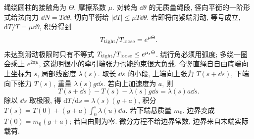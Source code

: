 绳绕圆柱的接触角为 $\Theta$, 摩擦系数 $\mu$. 对转角 $\dd\theta$ 的无质量绳段, 径向平衡的一阶形式给法向力 $\dd N=T\dd\theta$, 切向平衡给 $|\dd T|\le\mu T\dd\theta$. 若即将向紧端滑动, 等号成立, $\mathrm dT/T=\mu\dd\theta$, 积分得到
\begin{equation}
T_{\rm tight}/T_{\rm loose}=e^{\mu\Theta}.
\end{equation}
未达到滑动极限时只有不等式 $T_{\rm tight}/T_{\rm loose}\le e^{\mu_s\Theta}$. 绕行角必须用弧度; 多绕一圈会乘上 $e^{2\pi\mu}$, 这说明很小的牵引端张力也能约束很大负载.
令竖直绳自自由底端向上坐标为 $s$, 局部线密度 $\lambda(s)$. 取长 $\dd s$ 的小段, 上端向上张力 $T(s+\dd s)$, 下端向下张力 $T(s)$, 重量 $\lambda(s)g\dd s$. 若向上加速度为 $a$, 则
\begin{equation}
T(s+\dd s)-T(s)-\lambda(s)g\dd s=\lambda(s)a\dd s.
\end{equation}
除以 $\dd s$ 取极限, 得 $\mathrm dT/\mathrm ds=\lambda(s)(g+a)$, 积分 $T(s)=T(0)+(g+a)\int_0^s\lambda(u)\dd u$. 若下端悬质量 $m_0$, 边界变成 $T(0)=m_0(g+a)$; 若自由则为零. 微分方程不给边界常数, 边界来自末端实际载荷.
